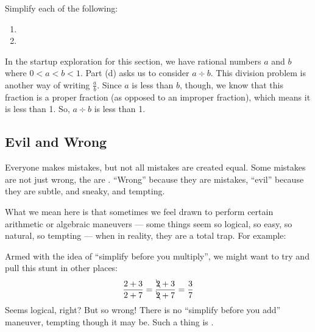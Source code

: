 \begin{boxedex}
Simplify each of the following:

\begin{enumerate}[itemsep=10pt]
\item {}

\item {}
\end{enumerate}
\end{boxedex}

\begin{boxedex}
In the startup exploration for this section, we have rational numbers $a$ and $b$ where $0 < a < b < 1$. Part (d) asks us to consider $a \div b$. This division problem is another way of writing $\frac{a}{b}$. Since $a$ is less than $b$, though, we know that this fraction is a proper fraction (as opposed to an improper fraction), which means it is less than 1. So, $a \div b$ is less than 1.
\end{boxedex}

\subsection{Evil and Wrong}

Everyone makes mistakes, but not all mistakes are created equal. Some mistakes are not just wrong, the are \evilandwrong. ``Wrong'' because they are mistakes, ``evil'' because they are subtle, and sneaky, and tempting.

What we mean here is that sometimes we feel drawn to perform certain arithmetic or algebraic maneuvers --- some things seem so logical, so easy, so natural, so tempting --- when in reality, they are a total trap. For example:

\begin{boxedwarning}
Armed with the idea of ``simplify before you multiply'', we might want to try and pull this stunt in other places: \[\frac{2+3}{2+7} = \frac{\bcancel{2}+3}{\bcancel{2}+7} = \frac{3}{7}\]Seems logical, right? But so wrong! There is no ``simplify before you add'' maneuver, tempting though it may be. Such a thing is \evilandwrong.
\end{boxedwarning}

